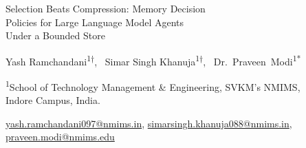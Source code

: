 \documentclass[11pt,a4paper]{article}
\begin{document}


\begin{center}
{\LARGE Selection Beats Compression: Memory Decision\\[2pt]
Policies for Large Language Model Agents\\[2pt]
Under a Bounded Store\par}
\vspace{1.4em}
{\normalsize Yash Ramchandani\textsuperscript{1$\dagger$}, \ Simar Singh Khanuja\textsuperscript{1$\dagger$}, \
\mbox{Dr.\ Praveen Modi\textsuperscript{1*}}\par}
\vspace{1em}
\textsuperscript{1}School of Technology Management \& Engineering, SVKM's NMIMS,\\
Indore Campus, India.\par
\vspace{0.6em}
{\small \href{mailto:yash.ramchandani097@nmims.in}{yash.ramchandani097@nmims.in},
\href{mailto:simarsingh.khanuja088@nmims.in}{simarsingh.khanuja088@nmims.in},\\
\href{mailto:praveen.modi@nmims.edu}{praveen.modi@nmims.edu}\par}
\end{center}
\end{document}
